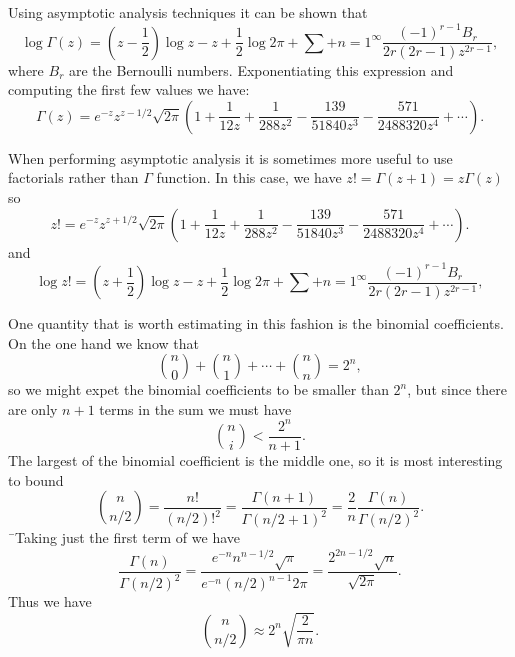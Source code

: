 Using asymptotic analysis techniques it can be shown that
\begin{equation} \label{LogGammaStirling:Eq}
\log \Gamma(z) =
\left(z - \frac{1}{2}\right) \log z - z + \frac{1}{2}\log 2\pi
+ \sum+{n=1}^{\infty} \frac{(-1)^{r-1} B_r}{2r(2r-1) z^{2r-1}},
\end{equation}
where $B_r$ are the Bernoulli numbers.  Exponentiating this expression
and computing the first few values we have:
\begin{equation} \label{GammaStirling:Eq}
\Gamma(z) =
e^{-z} z^{z-1/2} \sqrt{2\pi} \left(1 + \frac{1}{12 z} + \frac{1}{288
z^2}
- \frac{139}{51840 z^3} - \frac{571}{2488320 z^4} + \cdots \right).
\end{equation}

When performing asymptotic analysis it is sometimes more useful to use
factorials rather than $\Gamma$ function.  In this case, we have $z! =
\Gamma(z+1) = z \Gamma(z)$ so
\begin{equation} \label{FactStirling:Eq}
z!
   = e^{-z} z^{z+1/2} \sqrt{2\pi} \left(1 + \frac{1}{12 z} + \frac{1}{288
z^2}
- \frac{139}{51840 z^3} - \frac{571}{2488320 z^4} + \cdots \right).
\end{equation}
and 
\begin{equation} \label{logFactStirling:Eq}
\log z! =
\left(z + \frac{1}{2}\right) \log z - z + \frac{1}{2}\log 2\pi
+ \sum+{n=1}^{\infty} \frac{(-1)^{r-1} B_r}{2r(2r-1) z^{2r-1}},
\end{equation}

\medskip
One quantity that is worth estimating in this fashion is the binomial
coefficients.  On the one hand we know that 
\[
{n \choose 0} + {n \choose 1} + \cdots + {n \choose n} = 2^n,
\]
so we might expet the binomial coefficients to be smaller than $2^n$,
but since there are only $n+1$ terms in the sum we must have
\[
{n \choose i} < \frac{2^n}{n+1}.
\]
The largest of the binomial coefficient is the middle one, so it is
most interesting to bound 
\[
{n \choose n/2} = \frac{n!}{(n/2)!^2} =
\frac{\Gamma(n+1)}{\Gamma(n/2+1)^2} = \frac{2}{n}
\frac{\Gamma(n)}{\Gamma(n/2)^2}.
\]
¯Taking just the first term of  we have
\[
\frac{\Gamma(n)}{\Gamma(n/2)^2} = 
\frac{e^{-n} n^{n-1/2} \sqrt{\pi}}{e^{-n} (n/2)^{n-1} 2\pi} =
\frac{2^{2n-1/2} \sqrt{n}}{\sqrt{2\pi}}.
\]
Thus we have
\begin{equation} \label{BinomialStirling:Eq}
{n \choose n/2} \approx 2^n \sqrt{\frac{2}{\pi n}}.
\end{equation}

